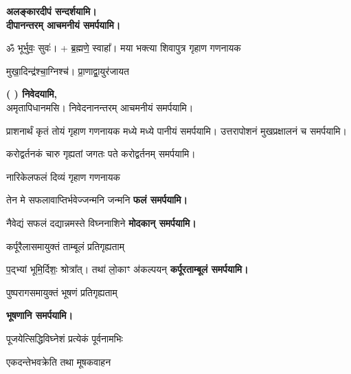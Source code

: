 \begin{center}
\textbf{\devAya{} अलङ्कारदीपं सन्दर्शयामि।\\
दीपानन्तरम् आचमनीयं समर्पयामि।}
\medskip

ॐ भूर्भुवः॒ सुवः॑। + ब्र॒ह्मणे॒ स्वाहा᳚।
{मया भक्त्या शिवापुत्र गृहाण गणनायक}

{मुखा॒दिन्द्र॑श्चा॒ग्निश्च॑। प्रा॒णाद्वा॒युर॑जायत}

\textbf{\devAya{} (	) निवेदयामि, \\}
अमृतापिधानमसि। निवेदनानन्तरम् आचमनीयं समर्पयामि।\medskip

{प्राशनार्थं कृतं तोयं गृहाण गणनायक}
मध्ये मध्ये पानीयं समर्पयामि। उत्तरापोशनं मुखप्रक्षालनं च समर्पयामि।\medskip

{करोद्वर्तनकं चारु गृह्यतां जगतः पते} 
करोद्वर्तनम् समर्पयामि।

{नारिकेलफलं दिव्यं गृहाण गणनायक} 

{तेन मे सफलावाप्तिर्भवेज्जन्मनि जन्मनि}
\textbf{\devAya{} फलं समर्पयामि।}
\medskip

{नैवेद्यं सफलं दद्यान्नमस्ते विघ्ननाशिने} 
\textbf{\devAya{} मोदकान् समर्पयामि।}
\medskip

{कर्पूरैलासमायुक्तं ताम्बूलं प्रतिगृह्यताम्}

{प॒द्भ्यां भूमि॒र्दिशः॒ श्रोत्रा᳚त्। तथा॑ लो॒काꣳ अ॑कल्पयन्}
\textbf{\devAya{} कर्पूरताम्बूलं समर्पयामि।}
\medskip



{पुष्परागसमायुक्तं भूषणं प्रतिगृह्यताम्} 

\textbf{\devAya{} भूषणानि समर्पयामि।}
\medskip

{पूजयेत्सिद्धिविघ्नेशं प्रत्येकं पूर्वनामभिः} 

{एकदन्तेभवक्रेति तथा मूषकवाहन}


\end{center}
